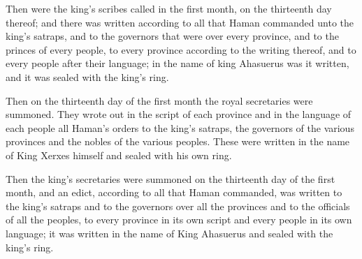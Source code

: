 			\begin{versebox}
					\item[BHS] 
					\item[LXX] 
					\item[ASV] Then were the king's scribes called in the first month, on the thirteenth day thereof; and there was written according to all that Haman commanded unto the king's satraps, and to the governors that were over every province, and to the princes of every people, to every province according to the writing thereof, and to every people after their language; in the name of king Ahasuerus was it written, and it was sealed with the king's ring.
					\item[NIV] Then on the thirteenth day of the first month the royal secretaries were summoned. They wrote out in the script of each province and in the language of each people all Haman’s orders to the king’s satraps, the governors of the various provinces and the nobles of the various peoples. These were written in the name of King Xerxes himself and sealed with his own ring.
					\item[NRSV] Then the king’s secretaries were summoned on the thirteenth day of the first month, and an edict, according to all that Haman commanded, was written to the king’s satraps and to the governors over all the provinces and to the officials of all the peoples, to every province in its own script and every people in its own language; it was written in the name of King Ahasuerus and sealed with the king’s ring.
			\end{versebox}

